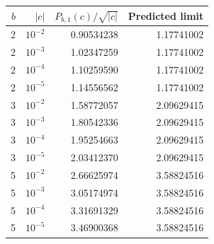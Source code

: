 \begin{tabular}{@{}rrr r@{}}
\toprule
$b$ & $|c|$ & $P_{b,1}(c)/\sqrt{|c|}$ & Predicted limit\\
\midrule
2 & $10^{-2}$ & 0.90534238 & 1.17741002\\
2 & $10^{-3}$ & 1.02347259 & 1.17741002\\
2 & $10^{-4}$ & 1.10259590 & 1.17741002\\
2 & $10^{-5}$ & 1.14556562 & 1.17741002\\
3 & $10^{-2}$ & 1.58772057 & 2.09629415\\
3 & $10^{-3}$ & 1.80542336 & 2.09629415\\
3 & $10^{-4}$ & 1.95254663 & 2.09629415\\
3 & $10^{-5}$ & 2.03412370 & 2.09629415\\
5 & $10^{-2}$ & 2.66625974 & 3.58824516\\
5 & $10^{-3}$ & 3.05174974 & 3.58824516\\
5 & $10^{-4}$ & 3.31691329 & 3.58824516\\
5 & $10^{-5}$ & 3.46900368 & 3.58824516\\
\bottomrule
\end{tabular}
